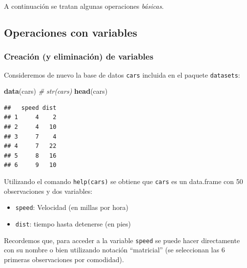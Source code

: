 \documentclass[
]{book}
\newenvironment{Shaded}{\begin{snugshade}}{\end{snugshade}}
\newcommand{\CommentTok}[1]{\textcolor[rgb]{0.56,0.35,0.01}{\textit{#1}}}
\newcommand{\FunctionTok}[1]{\textcolor[rgb]{0.13,0.29,0.53}{\textbf{#1}}}
\newcommand{\NormalTok}[1]{#1}
\newcommand{\SpecialCharTok}[1]{\textcolor[rgb]{0.81,0.36,0.00}{\textbf{#1}}}
\begin{document}
A continuación se tratan algunas operaciones \emph{básicas}.

\hypertarget{operaciones-con-variables}{%
\subsection{Operaciones con variables}\label{operaciones-con-variables}}

\hypertarget{creaciuxf3n-y-eliminaciuxf3n-de-variables}{%
\subsubsection{Creación (y eliminación) de variables}\label{creaciuxf3n-y-eliminaciuxf3n-de-variables}}

Consideremos de nuevo la base de datos \texttt{cars} incluida en el paquete \texttt{datasets}:

\begin{Shaded}
\begin{Highlighting}[]
\FunctionTok{data}\NormalTok{(cars)}
\CommentTok{\# str(cars)}
\FunctionTok{head}\NormalTok{(cars)}
\end{Highlighting}
\end{Shaded}

\begin{verbatim}
##   speed dist
## 1     4    2
## 2     4   10
## 3     7    4
## 4     7   22
## 5     8   16
## 6     9   10
\end{verbatim}

Utilizando el comando \texttt{help(cars)} se obtiene que \texttt{cars} es un data.frame con 50
observaciones y dos variables:

\begin{itemize}
\item
  \texttt{speed}: Velocidad (en millas por hora)
\item
  \texttt{dist}: tiempo hasta detenerse (en pies)
\end{itemize}

Recordemos que, para acceder a la variable \texttt{speed} se puede
hacer directamente con su nombre o bien utilizando notación
``matricial'' (se seleccionan las 6 primeras observaciones por comodidad).

\begin{Shaded}
\end{Shaded}
\end{document}

